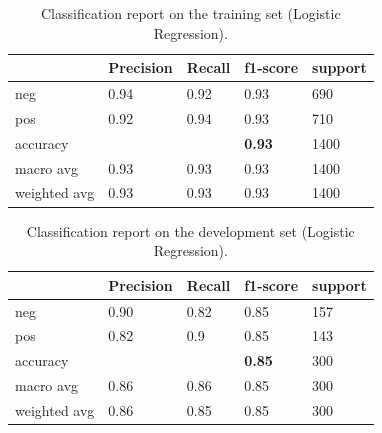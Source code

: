 \documentclass[10pt, a4paper]{article}
\begin{document}
	\begin{table}
		\begin{tabular}{|l|l|l|l|l|}
			\hline
			\cellcolor{blue!25}\textbf{} & \cellcolor{blue!25}\textbf{Precision} &
			\cellcolor{blue!25}\textbf{Recall}  &
			\cellcolor{blue!25}\textbf{f1-score}  &
			\cellcolor{blue!25}\textbf{support}\\
			\hline
			neg & 0.94 & 0.92 & 0.93 & 690 \\\hline
			pos & 0.92  & 0.94 & 0.93 & 710 \\\hline
			accuracy & & & \textbf{0.93} & 1400 \\\hline
			macro avg & 0.93 & 0.93 & 0.93 & 1400 \\\hline
			weighted avg & 0.93 & 0.93 & 0.93 & 1400 \\\hline
			
		\end{tabular}
		\centering
		\caption{Classification report on the training set (Logistic Regression).}
		\label{tab::ex-1-report-train-lr}
	\end{table}
	

 	\begin{table}
		\begin{tabular}{|l|l|l|l|l|}
			\hline
			\cellcolor{blue!25}\textbf{} & \cellcolor{blue!25}\textbf{Precision} &
			\cellcolor{blue!25}\textbf{Recall}  &
			\cellcolor{blue!25}\textbf{f1-score}  &
			\cellcolor{blue!25}\textbf{support}\\
			\hline
			neg & 0.90 & 0.82 & 0.85 & 157 \\\hline
			pos & 0.82  & 0.9 & 0.85 & 143 \\\hline
			accuracy & & & \textbf{0.85} & 300 \\\hline
			macro avg & 0.86 & 0.86 & 0.85 & 300 \\\hline
			weighted avg & 0.86 & 0.85 & 0.85 & 300 \\\hline
			
		\end{tabular}
		\centering
		\caption{Classification report on the development set (Logistic Regression).}
		\label{tab::ex-1-report-dev-lr}
	\end{table}
	
\end{document}
